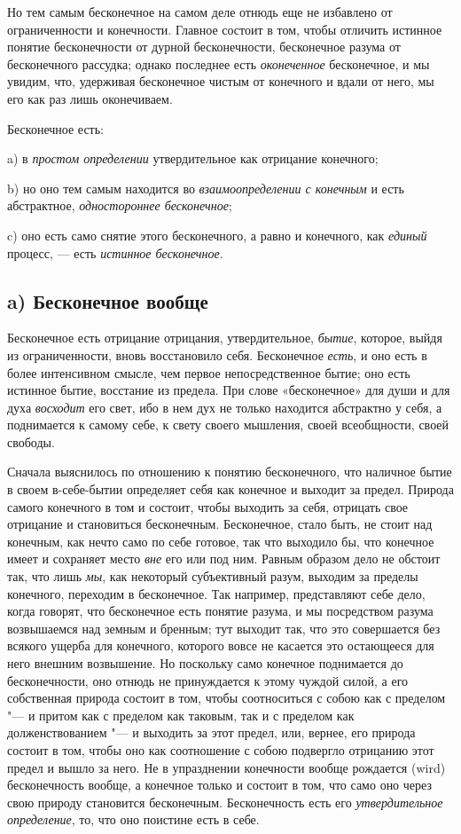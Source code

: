 Но тем самым бесконечное на самом деле отнюдь еще не избавлено от
ограниченности и конечности. Главное состоит в том, чтобы отличить истинное
понятие бесконечности от дурной бесконечности, бесконечное разума от
бесконечного рассудка; однако последнее есть
{\em оконеченное} бесконечное, и мы увидим, что,
удерживая бесконечное чистым от конечного и вдали от него, мы его как раз
лишь оконечиваем.

Бесконечное есть:

a) в {\em простом определении} утвердительное как
отрицание конечного;

b) но оно тем самым находится во {\em взаимоопределении
с конечным} и есть абстрактное, {\em одностороннее
бесконечное};

c) оно есть само снятие этого бесконечного, а равно и конечного, как
{\em единый} процесс, — есть
{\em истинное бесконечное}.

\subsection[a) Бесконечное вообще]{a) Бесконечное вообще}
Бесконечное есть отрицание отрицания, утвердительное,
{\em бытие}, которое, выйдя из ограниченности, вновь
восстановило себя. Бесконечное {\em есть}, и оно есть в
более интенсивном смысле, чем первое непосредственное бытие; оно есть
истинное бытие, восстание из предела. При слове «бесконечное» для души и
для духа {\em восходит} его свет, ибо в нем дух не
только находится абстрактно у себя, а поднимается к самому себе, к свету
своего мышления, своей всеобщности, своей свободы.

Сначала выяснилось по отношению к понятию бесконечного, что наличное бытие в
своем в-себе-бытии определяет себя как конечное и выходит за предел.
Природа самого конечного в том и состоит, чтобы выходить за себя, отрицать
свое отрицание и становиться бесконечным. Бесконечное, стало быть, не стоит
над конечным, как нечто само по себе готовое, так что выходило бы, что
конечное имеет и сохраняет место {\em вне} его или под
ним. Равным образом дело не обстоит так, что лишь
{\em мы}, как некоторый субъективный разум, выходим за
пределы конечного, переходим в бесконечное. Так например, представляют себе
дело, когда говорят, что бесконечное есть понятие разума, и мы посредством
разума возвышаемся над земным и бренным; тут выходит так, что это
совершается без всякого ущерба для конечного, которого вовсе не касается
это остающееся для него внешним возвышение. Но поскольку само конечное
поднимается до бесконечности, оно отнюдь не принуждается к этому чуждой
силой, а его собственная природа состоит в том, чтобы соотноситься с собою
как с пределом "--- и притом как с пределом как таковым, так и с пределом как
долженствованием "--- и выходить за этот предел, или, вернее, его природа
состоит в том, чтобы оно как соотношение с собою подвергло отрицанию этот
предел и вышло за него. Не в упразднении конечности вообще рождается (wird)
бесконечность вообще, а конечное только и состоит в том, что само оно через
свою природу становится бесконечным. Бесконечность есть его
{\em утвердительное определение}, то, что оно поистине
есть в себе.


